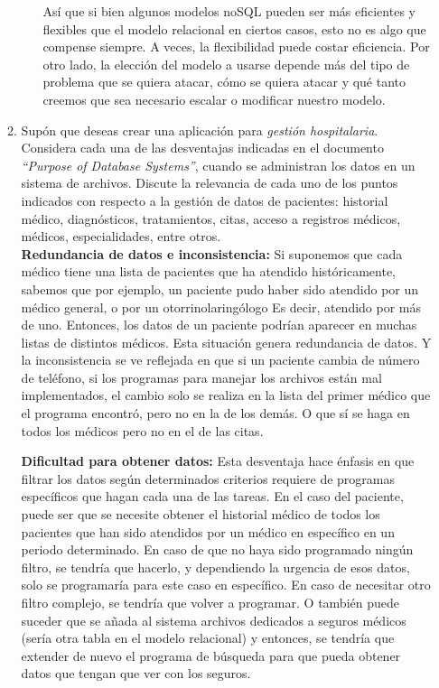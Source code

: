 \documentclass[12pt]{report}
\begin{document}
\begin{enumerate}[label=\textbf{\arabic*.}, leftmargin=*]
\begin{enumerate}[label=\textbf{\alph*.}, leftmargin=*, itemsep=1.0em]
\begin{itemize}
    Así que si bien algunos modelos noSQL pueden ser más eficientes y flexibles que el modelo relacional en ciertos casos, esto no es algo que compense siempre. A veces, la flexibilidad puede costar eficiencia.
    Por otro lado, la elección del modelo a usarse depende más del tipo de problema que se quiera atacar, cómo se quiera atacar y qué tanto creemos que sea necesario escalar o modificar nuestro modelo.

\end{itemize}

\item Sup\'on que deseas crear una aplicaci\'on para \textit{gesti\'on hospitalaria}. Considera cada una de las desventajas indicadas en el documento \textit{``Purpose of Database Systems''}, cuando se administran los datos en un sistema de archivos. Discute la relevancia de cada uno de los puntos indicados con respecto a la gesti\'on de datos de pacientes: historial m\'edico, diagn\'osticos, tratamientos, citas, acceso a registros m\'edicos, m\'edicos, especialidades, entre otros.\\

    \textbf{Redundancia de datos e inconsistencia:}
    Si suponemos que cada médico tiene una lista de pacientes que ha atendido históricamente, sabemos que por ejemplo, un paciente pudo haber sido atendido por un médico general, o por un otorrinolaringólogo Es decir, atendido por más de uno.
    Entonces, los datos de un paciente podrían aparecer en muchas listas de distintos médicos. Esta situación genera redundancia de datos. Y la inconsistencia se ve reflejada en que si un paciente cambia de número de teléfono, si los programas para manejar los archivos están mal implementados, el cambio solo se realiza en la lista del primer médico que el programa encontró, pero no en la de los demás. O que sí se haga en todos los médicos pero no en el de las citas.

    \textbf{Dificultad para obtener datos:}
    Esta desventaja hace énfasis en que filtrar los datos según determinados criterios requiere de programas específicos que hagan cada una de las tareas.
    En el caso del paciente, puede ser que se necesite obtener el historial médico de todos los pacientes que han sido atendidos por un médico en específico en un periodo determinado. En caso de que no haya sido programado ningún filtro, se tendría que hacerlo, y dependiendo la urgencia de esos datos, solo se programaría para este caso en específico. En caso de necesitar otro filtro complejo, se tendría que volver a programar. O también puede suceder que se añada al sistema archivos dedicados a seguros médicos (sería otra tabla en el modelo relacional) y entonces, se tendría que extender de nuevo el programa de búsqueda para que pueda obtener datos que tengan que ver con los seguros.


\end{enumerate}
\end{enumerate}
\end{document}

